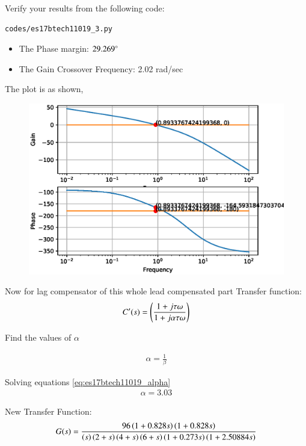 Verify your results from the following code:
\begin{lstlisting}
codes/es17btech11019_3.py
\end{lstlisting}
\begin{itemize}
    \item The Phase margin: $29.269\degree$
    \item The Gain Crossover Frequency: 2.02 rad/sec
\end{itemize}
%
The plot is as shown,
\begin{figure}[!ht]
  \centering
  \includegraphics[width=\columnwidth]{./figs/es17btech11019_2.eps}
  \caption{}
  \label{fig:es17btech11019_2}
\end{figure}

Now for lag compensator of this whole lead compensated part
Transfer function:
\begin{align}
C'(s)=\left(\frac{1+j\tau\omega}{1+j\alpha\tau\omega}\right)
\label{eq:es17btech11019_lag_compensator}
\end{align}

Find the values of $\alpha$ \\
\solution 

\begin{align}
\alpha=\frac{1}{\beta}
\label{eq:es17btech11019_alpha}
\end{align}

Solving equations \ref{eq:es17btech11019_alpha}
\begin{align}
\alpha=3.03
\label{eq:es17btech11019_final}
\end{align}

New Transfer Function:
\begin{align}
G(s)=\frac{96\left(1+ 0.828s\right)\left(1+0.828s\right)}{\left(s\right)\left(2+s\right)\left(4+s\right)\left(6+s\right)\left(1+0.273s\right)\left(1+2.50884s\right)}
\end{align}


